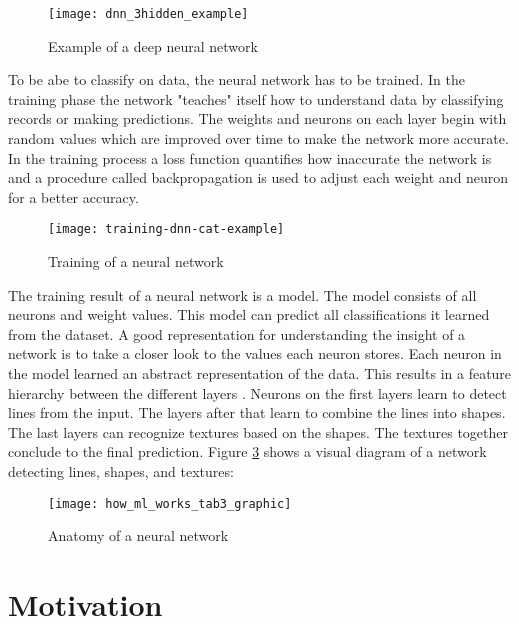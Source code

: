 \begin{figure}[H]
    \centering
    \texttt{[image: dnn\_3hidden\_example]}
    \caption{\cite{dnn_3hidden_example_image} Example of a deep neural network}
    \label{fig:dnn_3hidden_example}
\end{figure}

To be abe to classify on data, the neural network has to be trained.
In the training phase the network "teaches" itself how to understand data by classifying records or making predictions. \cite{ibm-watson-healthcare}
The weights and neurons on each layer begin with random values which are improved over time to make the network more accurate.
In the training process a loss function quantifies how inaccurate the network is and a procedure called backpropagation is used to adjust each weight and neuron for a better accuracy.
\cite{nvidia-ai-explained, tensorflow-about}

\begin{figure}[H]
    \centering
    \texttt{[image: training-dnn-cat-example]}
    \caption{\cite{tf_dnn_training_cat_example} Training of a neural network}
    \label{fig:tf_dnn_training_cat_example}
\end{figure}

The training result of a neural network is a model.
The model consists of all neurons and weight values.
\hfill \break
This model can predict all classifications it learned from the dataset.
A good representation for understanding the insight of a network is to take a closer look to the values each neuron stores.
Each neuron in the model learned an abstract representation of the data.
This results in a feature hierarchy between the different layers \cite{skymind_neural_network}.
Neurons on the first layers learn to detect lines from the input.
The layers after that learn to combine the lines into shapes.
The last layers can recognize textures based on the shapes.
The textures together conclude to the final prediction.
Figure \ref{fig:tf_dnn_shapes_textures} shows a visual diagram of a network detecting lines, shapes, and textures:
\cite{nvidia-ai-explained, tensorflow-about}

\begin{figure}[H]
    \centering
    \texttt{[image: how\_ml\_works\_tab3\_graphic]}
    \caption{\cite{tf_dnn_shapes_textures} Anatomy of a neural network}
    \label{fig:tf_dnn_shapes_textures}
\end{figure}

\section{Motivation}
\label{intro_motivation}

